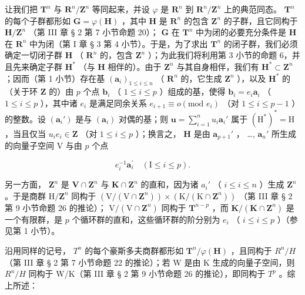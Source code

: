 让我们把 \(\mathbf{T}^n\) 与 \(\mathbf{R}^n/\mathbf{Z}^n\) 等同起来，并设 \(\varphi\) 是 \(\mathbf{R}^n\) 到 \(\mathbf{R}^n/\mathbf{Z}^n\) 上的典范同态。 \(\mathbf{T}^n\) 的每个子群都形如 \(\mathbf{G} = \varphi(\mathbf{H})\) ，其中 \(\mathbf{H}\) 是 \(\mathbf{R}^n\) 的包含 \(\mathbf{Z}^n\) 的子群，且它同构于 \(\mathbf{H}/\mathbf{Z}^n\) （第 III 章 § 2 第 7 小节命题 20）； \(\mathbf{G}\) 在 \(\mathbf{T}^n\) 中为闭的必要充分条件是 \(\mathbf{H}\) 在 \(\mathbf{R}^n\) 中为闭（第 I 章 § 3 第 4 小节）。于是，为了求出 \(\mathbf{T}^n\) 的闭子群，我们必须确定一切闭子群 \(\mathbf{H}\) （ \(\mathbf{R}^n\) 的，包含 \(\mathbf{Z}^n\) ）；为此我们将利用第 3 小节的命题 6，并且先来确定子群 \(\mathbf{H}^*\) （与 \(\mathbf{H}\) 相伴的）。由于 \(\mathbf{Z}^n\) 与其自身相伴，我们有 \(\mathbf{H}^* \subset \mathbf{Z}^n\) ；因而（第 1 小节）存在基 \((\boldsymbol{a}_i)_{1 \leqslant i \leqslant n}\) （ \(\mathbf{R}^n\) 的，它生成 \(\mathbf{Z}^n\) ），以及 \(\mathbf{H}^*\) 的（关于环 \(\mathbf{Z}\) 的）由 \(p\) 个点 \(\boldsymbol{b}_i\) （ \(1 \leqslant i \leqslant p\) ）组成的基，使得 \(\boldsymbol{b}_i = e_i \boldsymbol{a}_i\) （ \(1 \leqslant i \leqslant p\) ），其中诸 \(e_i\) 是满足同余关系 \(e_{i+1} \equiv o (\text{mod } e_i)\) （对 \(1 \leqslant i \leqslant p - 1\) ）的整数。设 \((\boldsymbol{a}_i')\) 是与 \((\boldsymbol{a}_i)\) 对偶的基；则 \(\boldsymbol{u} = \sum_{i=1}^{n} u_i \boldsymbol{a}_i'\) 属于 \((\mathrm{H}^*)^* = \mathrm{H}\) ，当且仅当 \(u_i e_i \in \mathbf{Z}\) （对 \(1 \leqslant i \leqslant p\) ）；换言之， \(\mathbf{H}\) 是由 \(\boldsymbol{a}_{p+1}'\) ， \ldots, \(\boldsymbol{a}_n'\) 所生成的向量子空间 V 与由 \(p\) 个点

\[
e _ {i} ^ {- 1} \boldsymbol {a} _ {i} ^ {\prime} \quad (\mathrm{I} \leqslant i \leqslant p).
\]

另一方面， \(\mathbf{Z}^n\) 是 \(\mathbf{V} \cap \mathbf{Z}^n\) 与 \(\mathbf{K} \cap \mathbf{Z}^n\) 的直和，因为诸 \(a_i'\) （ \(i \leqslant i \leqslant n\) ）生成 \(\mathbf{Z}^n\) 。于是商群 \(\mathrm{H} / \mathbf{Z}^n\) 同构于 \((\mathrm{V} / (\mathrm{V} \cap \mathbf{Z}^n)) \times (\mathrm{K} / (\mathrm{K} \cap \mathbf{Z}^n))\) （第 III 章 § 2 第 9 小节命题 26 的推论）； \(\mathrm{V} / (\mathrm{V} \cap \mathbf{Z}^n)\) 同构于 \(\mathbf{T}^{n-p}\) ，而 \(\mathbf{K} / (\mathbf{K} \cap \mathbf{Z}^n)\) 是一个有限群，是 \(p\) 个循环群的直和，这些循环群的阶分别为 \(e_i\) （ \(i \leqslant i \leqslant p\) ）（参见第 1 小节）。

沿用同样的记号， \(T^{n}\) 的每个豪斯多夫商群都形如 \(\mathbf{T}^{n}/\varphi(\mathbf{H})\) ，且同构于 \(R^{n}/H\) （第 III 章 § 2 第 7 小节命题 22 的推论）；若 W 是由 K 生成的向量子空间，则 \(R^{n}/H\) 同构于 W/K（第 III 章 § 2 第 9 小节命题 26 的推论），即同构于 \(T^{p}\) 。综上所述：

